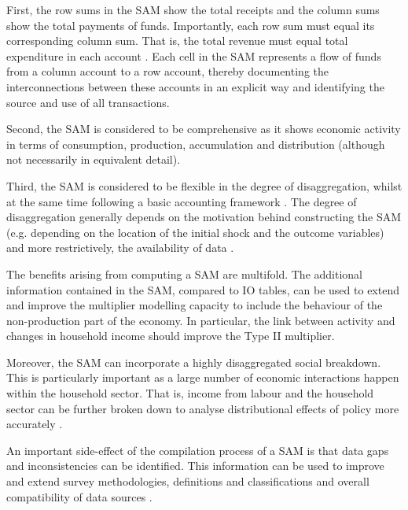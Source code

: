 \bigskip

First, the row sums in the SAM show the total receipts and the column sums show the total payments of funds. Importantly, each row sum must equal its corresponding column sum. That is, the total revenue must equal total expenditure in each account . Each cell in the SAM represents a flow of funds from a column account to a row account, thereby documenting the interconnections between these accounts in an explicit way and identifying the source and use of all transactions. 

\bigskip

Second, the SAM is considered to be comprehensive as it shows economic activity in terms of consumption, production, accumulation and distribution (although not necessarily in equivalent detail). 

\bigskip

Third, the SAM is considered to be flexible in the degree of disaggregation, whilst at the same time following a basic accounting framework . The degree of disaggregation generally depends on the motivation behind constructing the SAM (e.g. depending on the location of the initial shock and the outcome variables) and more restrictively, the availability of data \cite{Round2003a}. 

\bigskip

The benefits arising from computing a SAM are multifold. The additional information contained in the SAM, compared to IO tables, can be used to extend and improve the multiplier modelling capacity to include the behaviour of the non-production part of the economy. In particular, the link between activity and changes in household income should improve the Type II multiplier. 

\newpage

Moreover, the SAM can incorporate a highly disaggregated social breakdown. This is particularly important as a large number of economic interactions happen within the household sector. That is, income from labour and the household sector can be further broken down to analyse distributional effects of policy more accurately \cite{Stuttard2003b}. 

\bigskip

An important side-effect of the compilation process of a SAM is that data gaps and inconsistencies can be identified. This information can be used to improve and extend survey methodologies, definitions and classifications and overall compatibility of data sources \cite{Keuning1988a}. 

